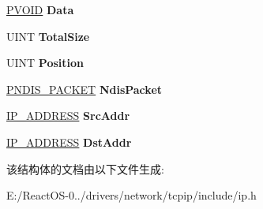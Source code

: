 \begin{DoxyCompactItemize}
\hyperlink{interfacevoid}{P\+V\+O\+ID} {\bfseries Data}
\item 
\mbox{\label{struct___i_p___p_a_c_k_e_t_af7b5872f0c86999a5b88e3b63450ccaa}} 
U\+I\+NT {\bfseries Total\+Size}
\item 
\mbox{\label{struct___i_p___p_a_c_k_e_t_a879ac7298616ea8a5895b1386e3097b7}} 
U\+I\+NT {\bfseries Position}
\item 
\mbox{\label{struct___i_p___p_a_c_k_e_t_a92caeba7b5a5e815e5e03be5ce3751ae}} 
\hyperlink{struct___n_d_i_s___p_a_c_k_e_t}{P\+N\+D\+I\+S\+\_\+\+P\+A\+C\+K\+ET} {\bfseries Ndis\+Packet}
\item 
\mbox{\label{struct___i_p___p_a_c_k_e_t_a6cb3571dd7e7fb789cb4aac769018e56}} 
\hyperlink{struct_i_p___a_d_d_r_e_s_s}{I\+P\+\_\+\+A\+D\+D\+R\+E\+SS} {\bfseries Src\+Addr}
\item 
\mbox{\label{struct___i_p___p_a_c_k_e_t_aaea002da42b45d1e8de4b7bb1350b4d1}} 
\hyperlink{struct_i_p___a_d_d_r_e_s_s}{I\+P\+\_\+\+A\+D\+D\+R\+E\+SS} {\bfseries Dst\+Addr}
\end{DoxyCompactItemize}


该结构体的文档由以下文件生成\+:\begin{DoxyCompactItemize}
\item 
E\+:/\+React\+O\+S-\/0../drivers/network/tcpip/include/ip.\+h\end{DoxyCompactItemize}

